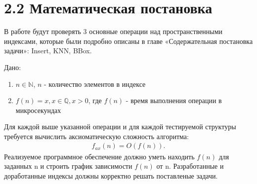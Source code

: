 \section{2.2 Математическая постановка}
\label{cha:math}

В работе будут проверять 3 основные операции над пространственными индексами, которые были подробно описаны в главе «Содержательная постановка задачи»: Insert, KNN, BBox.

Дано:
\begin{enumerate}
    \item $n \in \mathbb{N}$, $n$ - количество элементов в индексе
    \item $f(n) = x, x \in  \mathbb{Q}, x > 0$, где $f(n)$ - время выполнения операции в микросекундах
\end{enumerate}
Для каждой выше указанной операции и для каждой тестируемой структуры требуется вычислить аксиоматическую сложность алгоритма:
  \newline
\begin{align}
    f_{ax}(n) = O(f(n)).
\end{align}
  \newline
Реализуемое программное обеспечение должно уметь находить $f(n)$ для заданных n и строить график зависимости $f(n)$ от n.
Разработанные и доработанные индексы должны корректно решать поставленые задачи. 
